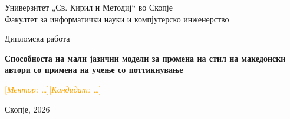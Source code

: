 \documentclass[12pt,a4paper]{report}
\newif\ifmk
\newcommand{\pending}[1]{\textcolor{orange}{[\emph{#1}]}}
\newcommand{\chapterfile}[1]{%
  \ifmk\IfFileExists{mk/#1.tex}{}{}\else\fi}
\begin{document}
\begin{titlepage}
\centering
\vspace*{2cm}
{\large Универзитет „Св. Кирил и Методиј“ во Скопје\\
Факултет за информатички науки и компјутерско инженерство\par}
\vspace{3cm}
{\Large Дипломска работа\par}
\vspace{1cm}
{\LARGE\bfseries Способноста на мали јазични модели за промена на стил на македонски
автори со примена на учење со поттикнување\par}
\vspace{3cm}
{\large \pending{Ментор: …}\hfill \pending{Кандидат: …}\par}
\vfill
{\large Скопје, 2026\par}
\end{titlepage}

\begin{abstract}
\pending{Апстракт --- written last (problem, method, the negative result with three or four numbers).}
\end{abstract}

\tableofcontents

\chapterfile{ch1_introduction}
\chapterfile{ch2_background}
\chapterfile{ch3_data}
\chapterfile{ch4_stylometry}
\chapterfile{ch5_path}
\chapterfile{ch6_method}
\chapterfile{ch7_evaluation}
\chapterfile{ch8_results}
\chapterfile{ch9_discussion}
\chapterfile{ch10_conclusion}

\appendix
\chapterfile{app_examples}
\chapterfile{app_prompts}
\chapterfile{app_reproducibility}



\end{document}
